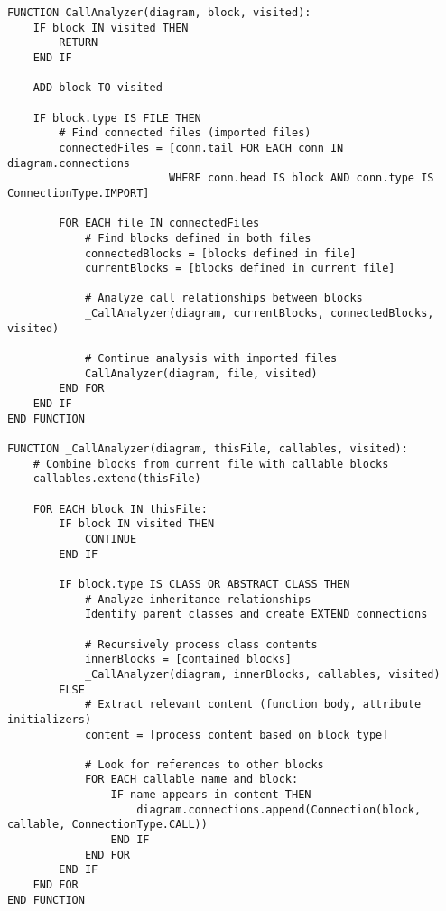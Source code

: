 \begin{lstlisting}[language=pseudocode, caption={$\texttt{CallAnalyzer}$ function (Pseudocode).}, label={lst:11}]
FUNCTION CallAnalyzer(diagram, block, visited):
    IF block IN visited THEN
        RETURN
    END IF
    
    ADD block TO visited
    
    IF block.type IS FILE THEN
        # Find connected files (imported files)
        connectedFiles = [conn.tail FOR EACH conn IN diagram.connections 
                         WHERE conn.head IS block AND conn.type IS ConnectionType.IMPORT]
        
        FOR EACH file IN connectedFiles
            # Find blocks defined in both files
            connectedBlocks = [blocks defined in file]
            currentBlocks = [blocks defined in current file]
            
            # Analyze call relationships between blocks
            _CallAnalyzer(diagram, currentBlocks, connectedBlocks, visited)
            
            # Continue analysis with imported files
            CallAnalyzer(diagram, file, visited)
        END FOR
    END IF
END FUNCTION

FUNCTION _CallAnalyzer(diagram, thisFile, callables, visited):
    # Combine blocks from current file with callable blocks
    callables.extend(thisFile)
    
    FOR EACH block IN thisFile:
        IF block IN visited THEN
            CONTINUE
        END IF
        
        IF block.type IS CLASS OR ABSTRACT_CLASS THEN
            # Analyze inheritance relationships
            Identify parent classes and create EXTEND connections
            
            # Recursively process class contents
            innerBlocks = [contained blocks]
            _CallAnalyzer(diagram, innerBlocks, callables, visited)
        ELSE
            # Extract relevant content (function body, attribute initializers)
            content = [process content based on block type]
            
            # Look for references to other blocks
            FOR EACH callable name and block:
                IF name appears in content THEN
                    diagram.connections.append(Connection(block, callable, ConnectionType.CALL))
                END IF
            END FOR
        END IF
    END FOR
END FUNCTION
\end{lstlisting}


